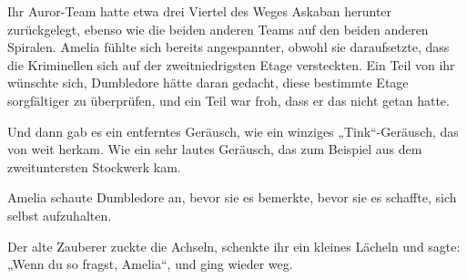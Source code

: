\later

Ihr Auror-Team hatte etwa drei Viertel des Weges Askaban herunter zurückgelegt, ebenso wie die beiden anderen Teams auf den beiden anderen Spiralen. Amelia fühlte sich bereits angespannter, obwohl sie daraufsetzte, dass die Kriminellen sich auf der zweitniedrigsten Etage versteckten. Ein Teil von ihr wünschte sich, Dumbledore hätte daran gedacht, diese bestimmte Etage sorgfältiger zu überprüfen, und ein Teil war froh, dass er das nicht getan hatte.

Und dann gab es ein entferntes Geräusch, wie ein winziges
„Tink“-Geräusch, das von weit herkam. Wie ein sehr lautes Geräusch, das zum Beispiel aus dem zweituntersten Stockwerk kam.

Amelia schaute Dumbledore an, bevor sie es bemerkte, bevor sie es schaffte, sich selbst aufzuhalten.

Der alte Zauberer zuckte die Achseln, schenkte ihr ein kleines Lächeln und sagte:
„Wenn du so fragst, Amelia“, und ging wieder weg.

\later

